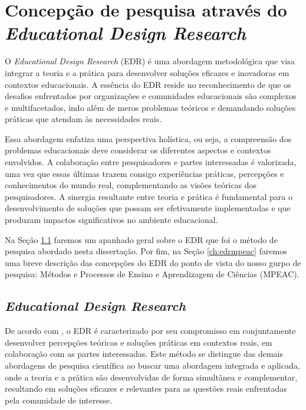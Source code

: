 \chapter{Concepção de pesquisa através do \textit{Educational Design Research}} \label{ch:edr}

O \textit{Educational Design Research} (EDR) é uma abordagem metodológica que visa integrar a teoria e a prática para desenvolver soluções eficazes e inovadoras em contextos educacionais. A essência do EDR reside no reconhecimento de que os desafios enfrentados por organizações e comunidades educacionais são complexos e multifacetados, indo além de meros problemas teóricos e demandando soluções práticas que atendam às necessidades reais.

Essa abordagem enfatiza uma perspectiva holística, ou seja, a compreensão dos problemas educacionais deve considerar os diferentes aspectos e contextos envolvidos. A colaboração entre pesquisadores e partes interessadas é valorizada, uma vez que essas últimas trazem consigo experiências práticas, percepções e conhecimentos do mundo real, complementando as visões teóricas dos pesquisadores. A sinergia resultante entre teoria e prática é fundamental para o desenvolvimento de soluções que possam ser efetivamente implementadas e que produzam impactos significativos no ambiente educacional.

Na Seção \ref{ch:edrtrue} faremos um apanhado geral sobre o EDR que foi o método de pesquisa abordado nesta dissertação. Por fim, na Seção \ref{ch:edrmpeac} faremos uma breve descrição das concepções do EDR do ponto de vista do nosso gurpo de pesquisa: Métodos e Processos de Ensino e Aprendizagem de Ciências (MPEAC).

\section{\textit{Educational Design Research}} \label{ch:edrtrue}

De acordo com , o EDR é caracterizado por seu compromisso em conjuntamente desenvolver percepções teóricas e soluções práticas em contextos reais, em colaboração com as partes interessadas. Este método se distingue das demais abordagens de pesquisa científica ao buscar uma abordagem integrada e aplicada, onde a teoria e a prática são desenvolvidas de forma simultânea e complementar, resultando em soluções eficazes e relevantes para as questões reais enfrentadas pela comunidade de interesse.

